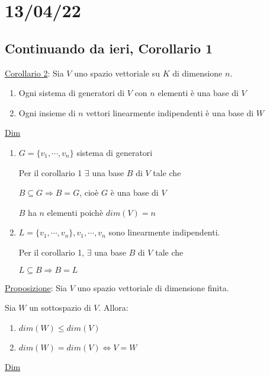 \documentclass{article}
\newcommand{\ul}[1]{\underline{#1}}
\begin{document}
\section{13/04/22}
\subsection{Continuando da ieri, Corollario 1}
\ul{Corollario 2}: Sia $V$ uno spazio vettoriale su $K$ di dimensione $n$.
\begin{enumerate}
	\item Ogni sistema di generatori di $V$ con $n$ elementi è una base di $V$
	\item Ogni insieme di $n$ vettori linearmente indipendenti è una base di $W$
\end{enumerate}

\ul{Dim}
\begin{enumerate}
	\item $G=\{v_1,\cdots,v_n\}$ sistema di generatori

	  Per il corollario 1 $\exists$ una base $B$ di $V$ tale che

	  $B\subseteq G\Rightarrow B=G$, cioè $G$ è una base di $V$

	  $B$ ha $n$ elementi poichè $dim(V)=n$
	\item $L=\{v_1,\cdots,v_n\},v_1,\cdots,v_n$ sono linearmente indipendenti.

	  Per il corollario 1, $\exists$ una base $B$ di $V$ tale che

	  $L\subseteq B\Rightarrow B=L$
\end{enumerate}

\ul{Proposizione}: Sia $V$ uno spazio vettoriale di dimensione finita.

Sia $W$ un sottospazio di $V$. Allora:
\begin{enumerate}
	\item $dim(W)\le dim(V)$
	\item $dim(W)=dim(V)\Leftrightarrow V=W$
\end{enumerate}

\ul{Dim}
\end{document}
